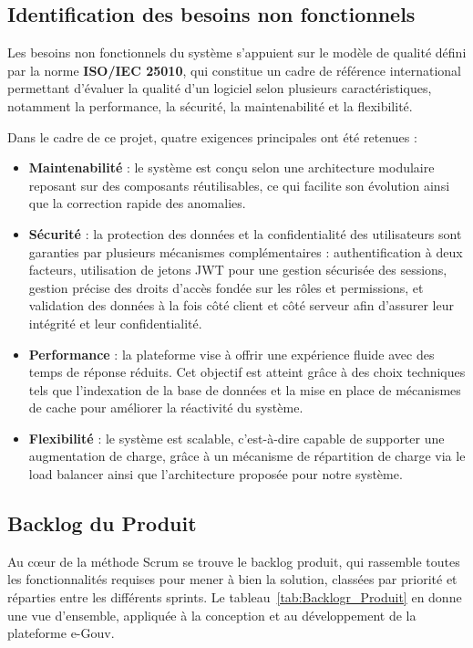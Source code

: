 \subsection{Identification des besoins non fonctionnels}

Les besoins non fonctionnels du système s’appuient sur le modèle de qualité défini par la norme \textbf{ISO/IEC 25010}, qui constitue un cadre de référence international permettant d’évaluer la qualité d’un logiciel selon plusieurs caractéristiques, notamment la performance, la sécurité, la maintenabilité et la flexibilité.

Dans le cadre de ce projet, quatre exigences principales ont été retenues :

\begin{itemize}
\item \textbf{Maintenabilité} : le système est conçu selon une architecture modulaire reposant sur des composants réutilisables, ce qui facilite son évolution ainsi que la correction rapide des anomalies.


\item \textbf{Sécurité} : la protection des données et la confidentialité des utilisateurs sont garanties par plusieurs mécanismes complémentaires : authentification à deux facteurs, utilisation de jetons JWT pour une gestion sécurisée des sessions, gestion précise des droits d’accès fondée sur les rôles et permissions, et validation des données à la fois côté client et côté serveur afin d’assurer leur intégrité et leur confidentialité.

\item \textbf{Performance} : la plateforme vise à offrir une expérience fluide avec des temps de réponse réduits. Cet objectif est atteint grâce à des choix techniques tels que l’indexation de la base de données et la mise en place de mécanismes de cache pour améliorer la réactivité du système.

\item \textbf{Flexibilité} : le système est scalable, c'est-à-dire capable de supporter une augmentation de charge, grâce à un mécanisme de répartition de charge via le load balancer ainsi que l’architecture proposée pour notre système.


\end{itemize}



\subsection{Backlog du Produit}
Au cœur de la méthode Scrum se trouve le backlog produit, qui rassemble toutes les fonctionnalités requises pour mener à bien la solution, classées par priorité et réparties entre les différents sprints. Le tableau~\ref{tab:Backlogr_Produit} en donne une vue d'ensemble, appliquée à la conception et au développement de la plateforme e-Gouv. 


